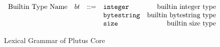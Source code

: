 \documentclass[../main.tex]{subfiles}
\begin{document}
\begin{figure*}[t]
\[\begin{array}{lrclr}
        \textrm{Builtin Type Name}    & bt  & ::= & \texttt{integer} & \textrm{builtin integer type}\\
                                      &     &     & \texttt{bytestring} & \textrm{builtin bytestring type}\\
                                      &     &     & \texttt{size} & \textrm{builtin size type}\\
    \end{array}\]
    \caption{Lexical Grammar of Plutus Core}
    \label{fig:Plutus_core_lexical_grammar}
\end{figure*}
\end{document}

